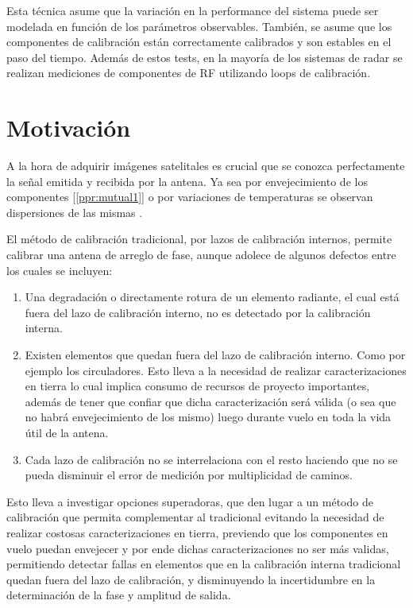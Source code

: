Esta técnica asume que la variación en la performance del sistema puede ser modelada en función de los parámetros observables. 
También, se asume que los componentes de calibración están correctamente calibrados y son estables en el paso del tiempo. 
Además de estos tests, en la mayoría de los sistemas de radar se realizan mediciones de componentes de RF utilizando loops de 
calibración.
	

\section{Motivación}

A la hora de adquirir imágenes satelitales es crucial que se conozca perfectamente la señal emitida y recibida por la antena. 
Ya sea por envejecimiento de los componentes [\ref{ppr:mutual1}] o por variaciones de temperaturas se observan dispersiones de 
las mismas \cite{Keizer2011}. 

El método de calibración tradicional, por lazos de calibración internos, permite calibrar una antena de arreglo de fase, aunque 
adolece de algunos defectos entre los cuales se incluyen:

\begin{enumerate}
    \item Una degradación o directamente rotura de un elemento radiante, el cual está fuera del lazo de calibración interno, no 
			es detectado por la calibración interna.
    \item Existen elementos que quedan fuera del lazo de calibración interno. Como por ejemplo los circuladores. Esto lleva a 
			la necesidad de realizar caracterizaciones en tierra lo cual implica consumo de recursos de proyecto importantes, 
			además de tener que confiar que dicha caracterización será válida (o sea que no habrá envejecimiento de los mismo) 
			luego durante vuelo en toda la vida útil de la antena.
    \item Cada lazo de calibración no se interrelaciona con el resto haciendo que no se pueda disminuir el error de medición por 
			multiplicidad de caminos.
\end{enumerate}

Esto lleva a investigar opciones superadoras, que den lugar a un método de calibración que permita complementar al tradicional 
evitando la necesidad de realizar costosas caracterizaciones en tierra, previendo que los componentes en vuelo puedan envejecer 
y por ende dichas caracterizaciones no ser más validas, permitiendo detectar fallas en elementos que en la calibración interna 
tradicional quedan fuera del lazo de calibración, y disminuyendo la incertidumbre en la determinación de la fase y amplitud de 
salida.

